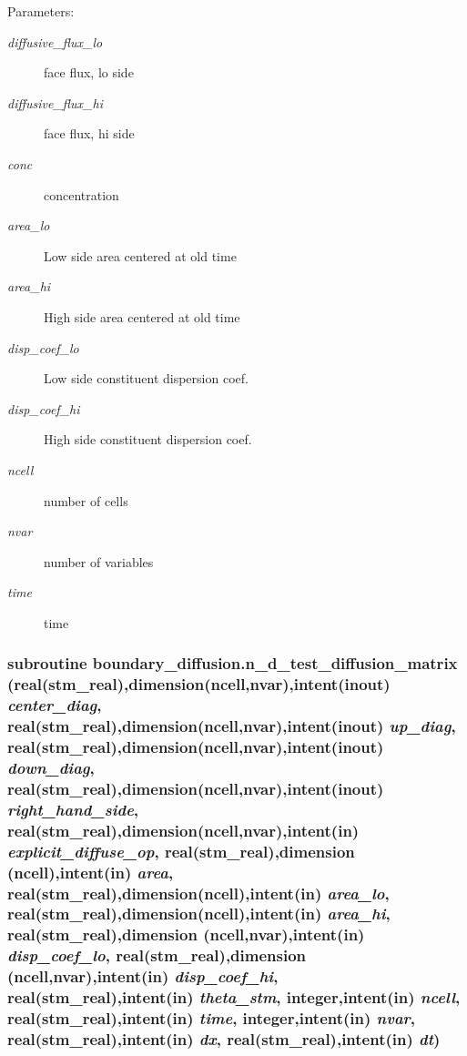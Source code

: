 \begin{Desc}
\item[Parameters:]
\begin{description}
\item[{\em diffusive\_\-flux\_\-lo}]face flux, lo side\item[{\em diffusive\_\-flux\_\-hi}]face flux, hi side\item[{\em conc}]concentration \item[{\em area\_\-lo}]Low side area centered at old time\item[{\em area\_\-hi}]High side area centered at old time\item[{\em disp\_\-coef\_\-lo}]Low side constituent dispersion coef.\item[{\em disp\_\-coef\_\-hi}]High side constituent dispersion coef.\item[{\em ncell}]number of cells\item[{\em nvar}]number of variables\item[{\em time}]time \end{description}
\end{Desc}
\hypertarget{a00054_c775cdd8eb15a9342ab20bf9e0cbe78a}{
\subsubsection[{n\_\-d\_\-test\_\-diffusion\_\-matrix}]{\setlength{\rightskip}{0pt plus 5cm}subroutine boundary\_\-diffusion.n\_\-d\_\-test\_\-diffusion\_\-matrix (real(stm\_\-real),dimension(ncell,nvar),intent(inout) {\em center\_\-diag}, \/  real(stm\_\-real),dimension(ncell,nvar),intent(inout) {\em up\_\-diag}, \/  real(stm\_\-real),dimension(ncell,nvar),intent(inout) {\em down\_\-diag}, \/  real(stm\_\-real),dimension(ncell,nvar),intent(inout) {\em right\_\-hand\_\-side}, \/  real(stm\_\-real),dimension(ncell,nvar),intent(in) {\em explicit\_\-diffuse\_\-op}, \/  real(stm\_\-real),dimension (ncell),intent(in) {\em area}, \/  real(stm\_\-real),dimension(ncell),intent(in) {\em area\_\-lo}, \/  real(stm\_\-real),dimension(ncell),intent(in) {\em area\_\-hi}, \/  real(stm\_\-real),dimension (ncell,nvar),intent(in) {\em disp\_\-coef\_\-lo}, \/  real(stm\_\-real),dimension (ncell,nvar),intent(in) {\em disp\_\-coef\_\-hi}, \/  real(stm\_\-real),intent(in) {\em theta\_\-stm}, \/  integer,intent(in) {\em ncell}, \/  real(stm\_\-real),intent(in) {\em time}, \/  integer,intent(in) {\em nvar}, \/  real(stm\_\-real),intent(in) {\em dx}, \/  real(stm\_\-real),intent(in) {\em dt})}}
\label{a00054_c775cdd8eb15a9342ab20bf9e0cbe78a}


